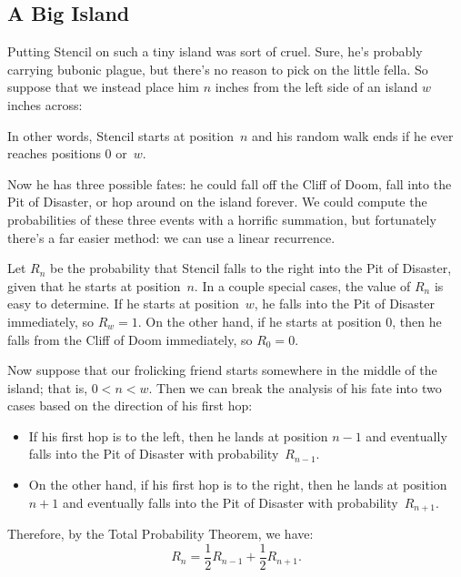 \subsection{A Big Island}\label{sec:flea_analysis}

Putting Stencil on such a tiny island was sort of cruel.  Sure, he's
probably carrying bubonic plague, but there's no reason to pick on the
little fella.  So suppose that we instead place him $n$ inches from
the left side of an island $w$ inches across:
%
\begin{figure}[h]


\end{figure}
%
In other words, Stencil starts at position~$n$ and his random walk
ends if he ever reaches positions 0 or~$w$.

Now he has three possible fates: he could fall off the Cliff of Doom,
fall into the Pit of Disaster, or hop around on the island forever.
We could compute the probabilities of these three events with a
horrific summation, but fortunately there's a far easier method: we
can use a linear recurrence.

Let $R_n$ be the probability that Stencil falls to the right into the
Pit of Disaster, given that he starts at position~$n$.  In a couple
special cases, the value of $R_n$ is easy to determine.  If he starts
at position~$w$, he falls into the Pit of Disaster immediately, so
$R_w = 1$.  On the other hand, if he starts at position $0$, then he
falls from the Cliff of Doom immediately, so $R_0 = 0$.

Now suppose that our frolicking friend starts somewhere in the middle
of the island; that is, $0 < n < w$.  Then we can break the analysis
of his fate into two cases based on the direction of his first hop:
%
\begin{itemize}

\item

If his first hop is to the left, then he lands at position $n-1$ and
eventually falls into the Pit of Disaster with probability~$R_{n-1}$.

\item

On the other hand, if his first hop is to the right, then he lands at
position~$n+1$ and eventually falls into the Pit of Disaster with
probability~$R_{n+1}$.

\end{itemize}
%
Therefore, by the Total Probability Theorem, we have:
%
\[
R_n = \frac{1}{2} R_{n-1} + \frac{1}{2} R_{n+1}.
\]

